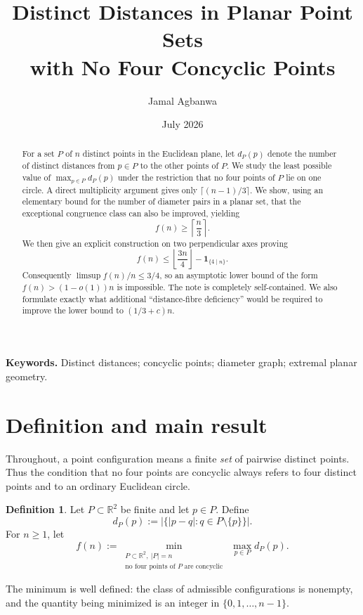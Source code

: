 \documentclass[11pt]{article}
\title{Distinct Distances in Planar Point Sets\\with No Four Concyclic Points}
\author{Jamal Agbanwa}
\date{July 2026}
\theoremstyle{definition}
\newtheorem{definition}[definition]{Definition}
\theoremstyle{remark}
\newcommand{\R}{\mathbb{R}}
\newcommand{\ind}{\mathbf{1}}
\begin{document}
\maketitle

\begin{abstract}
For a set $P$ of $n$ distinct points in the Euclidean plane, let $d_P(p)$ denote the number of distinct distances from $p\in P$ to the other points of $P$.  We study the least possible value of $\max_{p\in P}d_P(p)$ under the restriction that no four points of $P$ lie on one circle.  A direct multiplicity argument gives only $\lceil(n-1)/3\rceil$.  We show, using an elementary bound for the number of diameter pairs in a planar set, that the exceptional congruence class can also be improved, yielding
\[
   f(n)\ge \left\lceil\frac n3\right\rceil.
\]
We then give an explicit construction on two perpendicular axes proving
\[
   f(n)\le \left\lfloor\frac{3n}{4}\right\rfloor
          -\ind_{\{4\mid n\}}.
\]
Consequently $\limsup f(n)/n\le 3/4$, so an asymptotic lower bound of the form $f(n)>(1-o(1))n$ is impossible.  The note is completely self-contained.  We also formulate exactly what additional ``distance-fibre deficiency'' would be required to improve the lower bound to $(1/3+c)n$.
\end{abstract}

\medskip
\noindent\textbf{Keywords.} Distinct distances; concyclic points; diameter graph; extremal planar geometry.

\section{Definition and main result}

Throughout, a point configuration means a finite \emph{set} of pairwise distinct points.  Thus the condition that no four points are concyclic always refers to four distinct points and to an ordinary Euclidean circle.

\begin{definition}
Let $P\subset\R^2$ be finite and let $p\in P$.  Define
\[
 d_P(p):=\left|\bigl\{|p-q|:q\in P\setminus\{p\}\bigr\}\right|.
\]
For $n\ge 1$, let
\[
 f(n):=
 \min_{\substack{P\subset\R^2,\ |P|=n\\
                  \text{no four points of $P$ are concyclic}}}
       \ \max_{p\in P}d_P(p).
\]
\end{definition}

The minimum is well defined: the class of admissible configurations is nonempty, and the quantity being minimized is an integer in $\{0,1,\ldots,n-1\}$.
\end{document}
